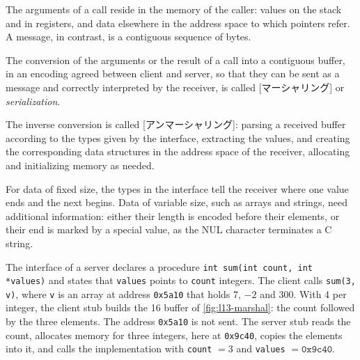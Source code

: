 \documentclass[../main.tex]{subfiles}
\begin{document}
The arguments of a call reside in the memory of the caller: values on the
stack and in registers, and data elsewhere in the address space to which
pointers refer.
A message, in contrast, is a contiguous sequence of bytes.

\begin{definition}[Marshalling]
  The conversion of the arguments or the result of a call into a
  contiguous buffer, in an encoding agreed between client and server, so
  that they can be sent as a message and correctly interpreted by the
  receiver, is called [マーシャリング] or
  \emph{serialization}.
\end{definition}

\begin{definition}[Unmarshalling]
  The inverse conversion is called [アンマーシャリング]:
  parsing a received buffer according to the types given by the interface,
  extracting the values, and creating the corresponding data structures in
  the address space of the receiver, allocating and initializing memory as
  needed.
\end{definition}

For data of fixed size, the types in the interface tell the receiver where
one value ends and the next begins.  Data of variable size, such as arrays
and strings, need additional information: either their length is encoded
before their elements, or their end is marked by a special value, as the
NUL character terminates a C string.

\begin{example}
  \label{ex:l13-marshal}
  The interface of a server declares a procedure
  \texttt{int sum(int count, int *values)} and states that
  \texttt{values} points to \texttt{count} integers.  The client calls
  \texttt{sum(3, v)}, where \texttt{v} is an array at address
  \texttt{0x5a10} that holds 7, $-2$ and 300.  With
  \SI{4}{\byte} per integer, the client stub builds the \SI{16}{\byte}
  buffer of \cref{fig:l13-marshal}: the count followed by the three
  elements.  The address \texttt{0x5a10} is not sent.  The server stub reads
  the count, allocates memory for three integers, here at \texttt{0x9c40},
  copies the elements into it, and calls the implementation with
  \texttt{count} $=3$ and \texttt{values} $=\mathtt{0x9c40}$.
\end{example}
\end{document}
